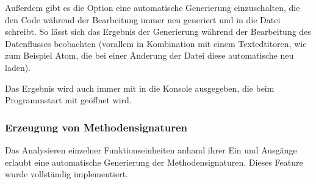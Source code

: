 \documentclass[11pt]{article}
\begin{document}
Außerdem gibt es die Option eine automatische Generierung einzuschalten, die
den Code während der Bearbeitung immer neu generiert und in die Datei
schreibt. So lässt sich das Ergebnis der Generierung während der Bearbeitung
des Datenflusses beobachten (vorallem in Kombination mit einem
Textedtitoren, wie zum Beispiel Atom, die bei einer Änderung der Datei diese automatische neu laden).

Das Ergebnis wird auch immer mit in die Konsole ausgegeben, die beim
Programmstart mit geöffnet wird.

\subsubsection{Erzeugung von Methodensignaturen}
\label{sec:orgheadline40}
Das Analysieren einzelner Funktionseinheiten anhand ihrer Ein und Ausgänge
erlaubt eine automatische Generierung der Methodensignaturen.
Dieses Feature wurde vollständig implementiert.
\end{document}
